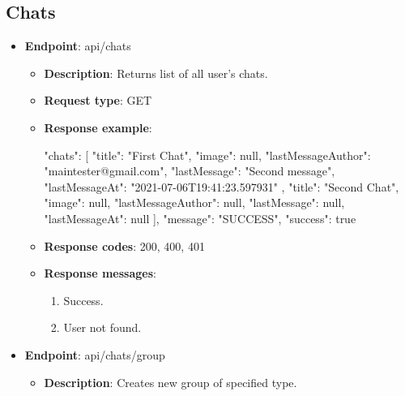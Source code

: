 \subsection{Chats}\label{subsec:chats}
\begin{itemize}
    \item \textbf{Endpoint}: api/chats
    \begin{itemize}

        \item \textbf{Description}: Returns list of all user's chats.

        \item \textbf{Request type}: GET

        \item \textbf{Response example}:

        \begin{spverbatim}
        {
            "chats": [
                {
                "title": "First Chat",
                "image": null,
                "lastMessageAuthor": "maintester@gmail.com",
                "lastMessage": "Second message",
                "lastMessageAt": "2021-07-06T19:41:23.597931"
            },
                {
                "title": "Second Chat",
                "image": null,
                "lastMessageAuthor": null,
                "lastMessage": null,
                "lastMessageAt": null
            }
            ],
            "message": "SUCCESS",
            "success": true
        }
        \end{spverbatim}

        \item \textbf{Response codes}: 200, 400, 401

        \item \textbf{Response messages}:
        \begin{enumerate}
            \item Success.
            \item User not found.
        \end{enumerate}
    \end{itemize}

    \item \textbf{Endpoint}: api/chats/group

    \begin{itemize}
        \item \textbf{Description}: Creates new group of specified type.


\end{itemize}
\end{itemize}
